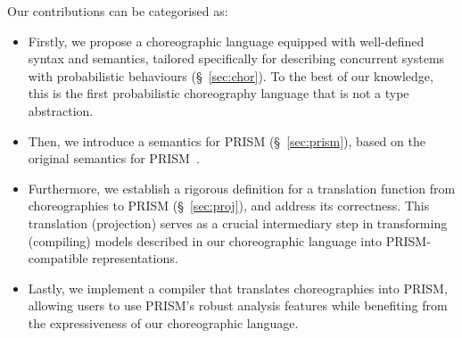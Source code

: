  Our contributions can be
categorised as:
\begin{itemize} 
\item Firstly, we propose a choreographic language equipped with
  well-defined syntax and semantics, tailored specifically for
  describing concurrent systems with probabilistic behaviours
  (\S~\ref{sec:chor}). To the best of our knowledge, this is the first
  probabilistic choreography language that is not a type abstraction.
\item Then, we introduce a semantics for PRISM (\S~\ref{sec:prism}),
  based on the original semantics for PRISM~\cite{PRISMdoc}.
\item Furthermore, we establish a rigorous definition for a
  translation function from choreographies to PRISM
  (\S~\ref{sec:proj}), and address its correctness. This translation
  (projection) serves as a crucial intermediary step in transforming
  (compiling) models described in our choreographic language into
  PRISM-compatible representations.
\item Lastly, we implement a compiler that translates choreographies
  into PRISM, allowing users to use PRISM's robust analysis features
  while benefiting from the expressiveness of our choreographic
  language.
\end{itemize}




